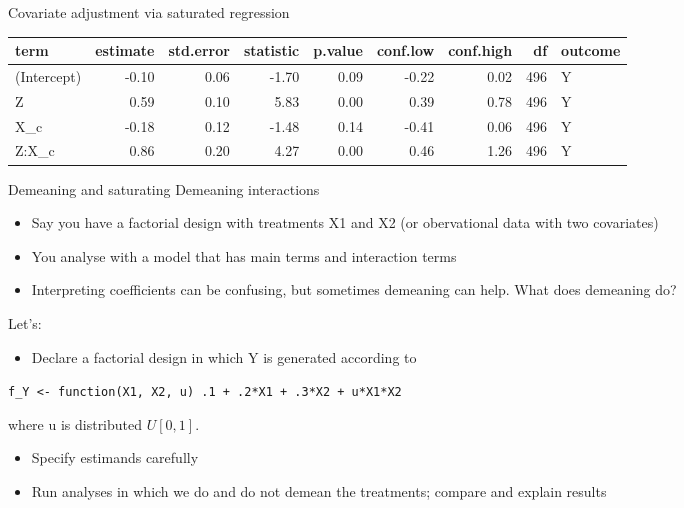 \documentclass[
  11pt,
  ignorenonframetext,
]{beamer}
\providecommand{\tightlist}{%
  \setlength{\itemsep}{0pt}\setlength{\parskip}{0pt}}\usepackage{longtable,booktabs,array}
\begin{document}
\begin{frame}[fragile]{Covariate adjustment via saturated regression}
\begin{tabular}{l|r|r|r|r|r|r|r|l}
\hline
term & estimate & std.error & statistic & p.value & conf.low & conf.high & df & outcome\\
\hline
(Intercept) & -0.10 & 0.06 & -1.70 & 0.09 & -0.22 & 0.02 & 496 & Y\\
\hline
Z & 0.59 & 0.10 & 5.83 & 0.00 & 0.39 & 0.78 & 496 & Y\\
\hline
X\_c & -0.18 & 0.12 & -1.48 & 0.14 & -0.41 & 0.06 & 496 & Y\\
\hline
Z:X\_c & 0.86 & 0.20 & 4.27 & 0.00 & 0.46 & 1.26 & 496 & Y\\
\hline
\end{tabular}
\end{frame}

\begin{frame}[fragile]{Demeaning and saturating}
\protect\hypertarget{demeaning-and-saturating}{}
Demeaning interactions

\begin{itemize}
\tightlist
\item
  Say you have a factorial design with treatments X1 and X2 (or
  obervational data with two covariates)
\item
  You analyse with a model that has main terms and interaction terms
\item
  Interpreting coefficients can be confusing, but sometimes demeaning
  can help. What does demeaning do?
\end{itemize}

Let's:

\begin{itemize}
\tightlist
\item
  Declare a factorial design in which Y is generated according to
\end{itemize}

\texttt{f\_Y\ \textless{}-\ function(X1,\ X2,\ u)\ .1\ +\ .2*X1\ +\ .3*X2\ +\ u*X1*X2}

where u is distributed \(U[0,1]\).

\begin{itemize}
\tightlist
\item
  Specify estimands carefully
\item
  Run analyses in which we do and do not demean the treatments; compare
  and explain results
\end{itemize}
\end{frame}
\end{document}
